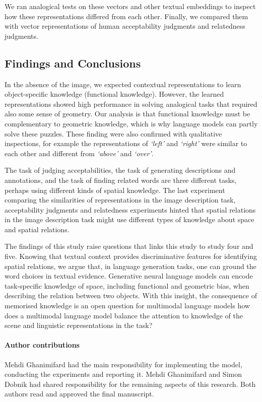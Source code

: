We ran analogical tests on these vectors and other textual embeddings to inspect how these representations differed from each other. 
Finally, we compared them with vector representations of human acceptability judgments and relatedness judgments.

\subsection{Findings and Conclusions}
In the absence of the image, we expected contextual representations to learn object-specific knowledge (functional knowledge). 
However, the learned representations showed high performance in solving analogical tasks that required also some sense of geometry. 
Our analysis is that functional knowledge must be complementary to geometric knowledge, which is why language models can partly solve these puzzles. 
These finding were also confirmed with qualitative inspections,
for example
the representations of \emph{`left'} and \emph{`right'} were similar to each other and different from \emph{`above'} and \emph{`over'}.

The task of judging acceptabilities, the task of generating descriptions and annotations, and the task of finding related words are three different tasks, perhaps using different kinds of spatial knowledge.
The last experiment comparing the similarities of representations in the image description task, acceptability judgments and relatedness experiments hinted that spatial relations in the image description task might use different types of knowledge about space and spatial relations. 

The findings of this study raise questions that links this study to study four and five.
Knowing that textual context provides discriminative features for identifying spatial relations, we argue that, in language generation tasks, one can ground the word choices in textual evidence. 
Generative neural language models can encode task-specific knowledge of space, including functional and geometric bias, when describing the relation between two objects. 
With this insight, the consequence of memorised knowledge is an open question for multimodal language models \textemdash how does a multimodal language model balance the attention to knowledge of the scene and linguistic representations in the task? 

\paragraph{Author contributions}
Mehdi Ghanimifard had the main responsibility for implementing the model, conducting the experiments and reporting it. Mehdi Ghanimifard and Simon Dobnik had shared responsibility for the remaining aspects of this research. Both authors read and approved the final manuscript.

